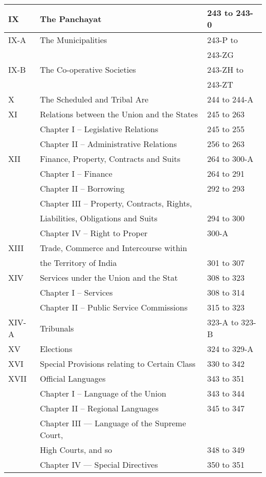 \begin{longtable}[c]{@{}|p{.7cm}|p{8cm}|p{4cm}|@{}}
  IX & The Panchayat & 243 to 243-0 \\\midrule
  IX-A & The Municipalities & 243-P to\\
       &                  & 243-ZG \\\midrule
  IX-B & The Co-operative Societies & 243-ZH to \\
  & & 243-ZT \\\midrule
  X & The Scheduled and Tribal Are & 244 to 244-A \\\midrule
  XI & Relations between the Union and the States & 245 to 263 \\
  & Chapter I – Legislative Relations & 245 to 255 \\
  & Chapter II – Administrative Relations & 256 to 263 \\\midrule
  XII & Finance, Property, Contracts and Suits & 264 to 300-A \\*\midrule
  & Chapter I – Finance & 264 to 291 \\
  & Chapter II – Borrowing & 292 to 293 \\
  & Chapter III – Property, Contracts, Rights, &  \\
  & Liabilities, Obligations and Suits & 294 to 300 \\
  & Chapter IV – Right to Proper & 300-A \\ \midrule
  XIII & Trade, Commerce and Intercourse within & \\
       & the Territory of India & 301 to 307 \\\midrule
  XIV & Services under the Union and the Stat & 308 to 323 \\
  & Chapter I – Services & 308 to 314 \\
  & Chapter II – Public Service Commissions & 315 to 323 \\\midrule
  XIV-A & Tribunals & 323-A to 323-B \\\midrule
  XV & Elections & 324 to 329-A \\\midrule
  XVI & Special Provisions relating to Certain Class & 330 to 342 \\\midrule
  XVII & Official Languages & 343 to 351 \\
  & Chapter I – Language of the Union & 343 to 344 \\
  & Chapter II – Regional Languages & 345 to 347 \\
  & Chapter III — Language of the Supreme Court, & \\
  & High Courts, and so & 348 to 349 \\
  & Chapter IV — Special Directives & 350 to 351 \\\midrule

\end{longtable}
